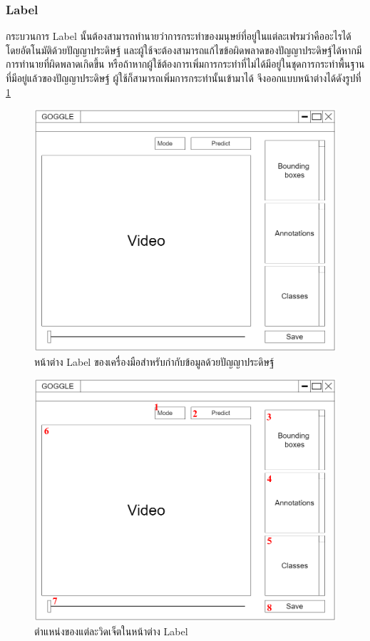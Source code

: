 \subsubsection{Label}
กระบวนการ Label นั้นต้องสามารถทำนายว่าการกระทำของมนุษย์ที่อยู่ในแต่ละเฟรมว่าคืออะไรได้โดยอัตโนมัติด้วยปัญญาประดิษฐ์
และผู้ใช้จะต้องสามารถแก้ไขข้อผิดพลาดของปัญญาประดิษฐ์ได้หากมีการทำนายที่ผิดพลาดเกิดขึ้น
หรือถ้าหากผู้ใช้ต้องการเพิ่มการกระทำที่ไม่ได้มีอยู่ในชุดการกระทำพื้นฐานที่มีอยู่แล้วของปัญญาประดิษฐ์ ผู้ใช้ก็สามารถเพิ่มการกระทำนั้นเข้ามาได้
จึงออกแบบหน้าต่างได้ดังรูปที่ \ref{fig:ActionLabelDraft}
\begin{figure}[!ht]
    \centering
    \includegraphics[width=1\textwidth]{chapter3/images/3_6/ActionLabelDraft.png}
    \caption{หน้าต่าง Label ของเครื่องมือสำหรับกำกับข้อมูลด้วยปัญญาประดิษฐ์}
    \label{fig:ActionLabelDraft}
\end{figure}
\clearpage
\begin{figure}[!ht]
    \centering
    \includegraphics[width=1\textwidth]{chapter3/images/3_6/ActionLabelDraft_point.png}
    \caption{ตำแหน่งของแต่ละวิดเจ็ตในหน้าต่าง Label}
    \label{fig:ActiobLabelDraft_point}
\end{figure}
